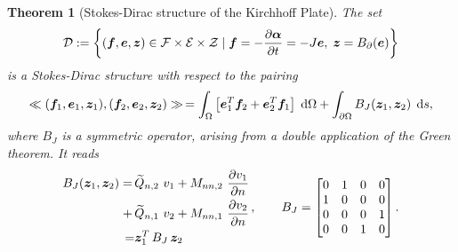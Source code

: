\documentclass[preprint,12pt]{elsarticle}
\newtheorem{theorem}{Theorem}
\begin{document}
	\begin{theorem}[Stokes-Dirac structure of the Kirchhoff Plate]
		The set
	\begin{equation}
	\mathcal{D} := \left\{ (\bm{f},\bm{e},\bm{z}) \in \mathcal{F}\times\mathcal{E}\times\mathcal{Z} \; | \; \bm{f}= - \diffp{\bm{\alpha}}{t} = -J \bm{e}, \; \bm{z} = B_{\partial}(\bm{e}) \right\}
	\end{equation} 
	is a Stokes-Dirac structure with respect to the pairing
	\begin{equation}
	\ll (\bm{f}_1, \bm{e}_1, \bm{z}_1), (\bm{f}_2, \bm{e}_2, \bm{z}_2) \gg  \,= \int_{\Omega} \left[ \bm{e}_1^T \bm{f}_2 + \bm{e}_2^T \bm{f}_1 \right] \d{\Omega}  + \int_{\partial \Omega} B_J(\bm{z}_1, \bm{z}_2) \, \d{s},
	\end{equation}
		where $B_J$ is a symmetric operator, arising from a double application of the Green theorem. It reads
		\begin{equation}
		\begin{aligned}
		B_J(\bm{z}_1,\bm{z}_2) = \, &\widetilde{Q}_{n, 2} \ v_1 + M_{nn, 2} \ \diffp{v_1}{n} \\
		+ \, &\widetilde{Q}_{n, 1} \ v_2 + M_{nn, 1} \ \diffp{v_2}{n} \\
		= &\bm{z}_1^T \, B_J \, \bm{z}_2 \\
		\end{aligned} \, , \qquad	B_J = 
		\begin{bmatrix}
		0 & 1 & 0 & 0 \\
		1 & 0 & 0 & 0 \\
		0 & 0 & 0 & 1 \\
		0 & 0 & 1 & 0 \\ 
		\end{bmatrix}.
		\end{equation}
	\end{theorem}
\end{document}

